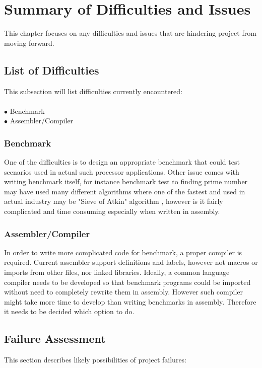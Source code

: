 \documentclass[a4paper,12pt]{article}
\begin{document}
\section{Summary of Difficulties and Issues}
\begin{multicols}{2}
This chapter focuses on any difficulties and issues that are hindering project from moving forward.

\subsection{List of Difficulties}

This subsection will list difficulties currently encountered:\\
\\
$\bullet$ Benchmark\\
$\bullet$ Assembler/Compiler

\subsubsection{Benchmark} \label{sec:benchmark_issues}
One of the difficulties is to design an appropriate benchmark that could test scenarios used in actual such processor applications. Other issue comes with writing benchmark itself, for instance benchmark test to finding prime number may have used many different algorithms where one of the fastest and used in actual industry may be "Sieve of Atkin" algorithm \autocite{morain_1989}, however is it fairly complicated and time consuming especially when written in assembly. 

\subsubsection{Assembler/Compiler}
In order to write more complicated code for benchmark, a proper compiler is required. Current assembler support definitions and labels, however not macros or imports from other files, nor linked libraries. Ideally, a common language compiler needs to be developed so that benchmark programs could be imported without need to completely rewrite them in assembly. However such compiler might take more time to develop than writing benchmarks in assembly. Therefore it needs to be decided which option to do.

\subsection{Failure Assessment}
This section describes likely possibilities of project failures:


\end{multicols}
\end{document}
